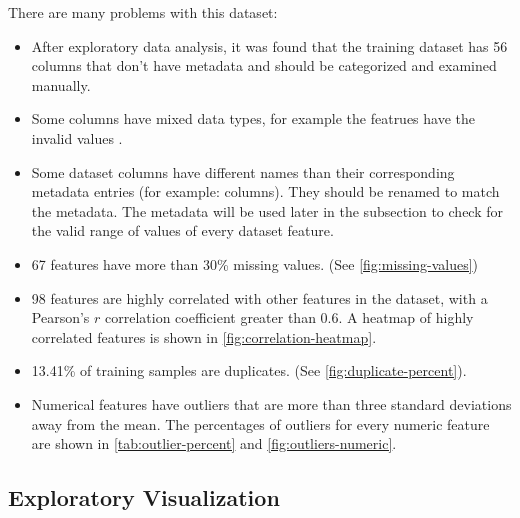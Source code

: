 \documentclass[a4paper]{article}
\begin{document}
{    There are many problems with this dataset:
    \begin{itemize}
    \item After exploratory data analysis, it was found that the training dataset has 56 columns that don't have metadata and should be categorized and examined manually.
    \item Some columns have mixed data types, for example the featrues  have the invalid values \code{['X', 'XX']}.
    \item Some dataset columns have different names than their corresponding metadata entries (for example:  columns). They should be renamed to match the metadata. The metadata will be used later in the  subsection to check for the valid range of values of every dataset feature.
    \item 67 features have more than 30\% missing values. (See \autoref{fig:missing-values})
    \item 98 features are highly correlated with other features in the dataset, with a Pearson's $r$ correlation coefficient greater than $0.6$. A heatmap of highly correlated features is shown in \autoref{fig:correlation-heatmap}.
    \item 13.41\% of training samples are duplicates. (See \autoref{fig:duplicate-percent}).
    \item Numerical features have outliers that are more than three standard deviations away from the mean. The percentages of outliers for every numeric feature are shown in \autoref{tab:outlier-percent} and \autoref{fig:outliers-numeric}.
      
      
    \end{itemize}

    \pagebreak
    \subsection{Exploratory Visualization}
    \label{sec:expl-visu}


}
\end{document}
